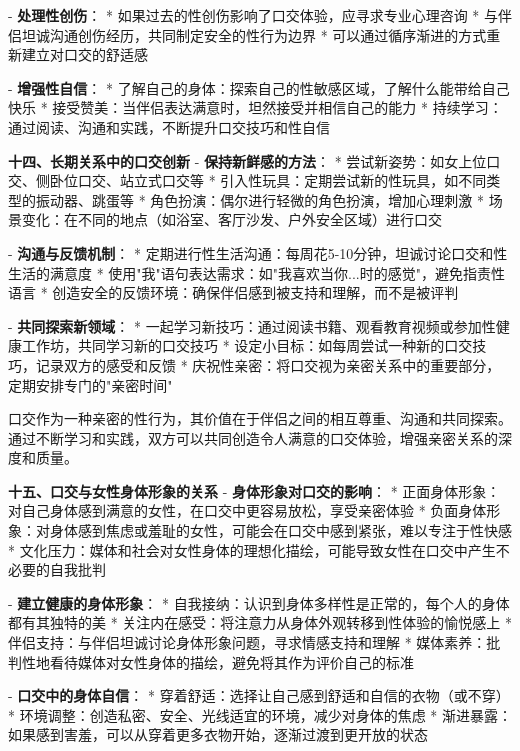 \begin{enumerate}
  - \textbf{处理性创伤}：
    * 如果过去的性创伤影响了口交体验，应寻求专业心理咨询
    * 与伴侣坦诚沟通创伤经历，共同制定安全的性行为边界
    * 可以通过循序渐进的方式重新建立对口交的舒适感

  - \textbf{增强性自信}：
    * 了解自己的身体：探索自己的性敏感区域，了解什么能带给自己快乐
    * 接受赞美：当伴侣表达满意时，坦然接受并相信自己的能力
    * 持续学习：通过阅读、沟通和实践，不断提升口交技巧和性自信

  \textbf{十四、长期关系中的口交创新}
  - \textbf{保持新鲜感的方法}：
    * 尝试新姿势：如女上位口交、侧卧位口交、站立式口交等
    * 引入性玩具：定期尝试新的性玩具，如不同类型的振动器、跳蛋等
    * 角色扮演：偶尔进行轻微的角色扮演，增加心理刺激
    * 场景变化：在不同的地点（如浴室、客厅沙发、户外安全区域）进行口交

  - \textbf{沟通与反馈机制}：
    * 定期进行性生活沟通：每周花5-10分钟，坦诚讨论口交和性生活的满意度
    * 使用"我"语句表达需求：如"我喜欢当你...时的感觉"，避免指责性语言
    * 创造安全的反馈环境：确保伴侣感到被支持和理解，而不是被评判

  - \textbf{共同探索新领域}：
    * 一起学习新技巧：通过阅读书籍、观看教育视频或参加性健康工作坊，共同学习新的口交技巧
    * 设定小目标：如每周尝试一种新的口交技巧，记录双方的感受和反馈
    * 庆祝性亲密：将口交视为亲密关系中的重要部分，定期安排专门的"亲密时间"

口交作为一种亲密的性行为，其价值在于伴侣之间的相互尊重、沟通和共同探索。通过不断学习和实践，双方可以共同创造令人满意的口交体验，增强亲密关系的深度和质量。

  \textbf{十五、口交与女性身体形象的关系}
  - \textbf{身体形象对口交的影响}：
    * 正面身体形象：对自己身体感到满意的女性，在口交中更容易放松，享受亲密体验
    * 负面身体形象：对身体感到焦虑或羞耻的女性，可能会在口交中感到紧张，难以专注于性快感
    * 文化压力：媒体和社会对女性身体的理想化描绘，可能导致女性在口交中产生不必要的自我批判

  - \textbf{建立健康的身体形象}：
    * 自我接纳：认识到身体多样性是正常的，每个人的身体都有其独特的美
    * 关注内在感受：将注意力从身体外观转移到性体验的愉悦感上
    * 伴侣支持：与伴侣坦诚讨论身体形象问题，寻求情感支持和理解
    * 媒体素养：批判性地看待媒体对女性身体的描绘，避免将其作为评价自己的标准

  - \textbf{口交中的身体自信}：
    * 穿着舒适：选择让自己感到舒适和自信的衣物（或不穿）
    * 环境调整：创造私密、安全、光线适宜的环境，减少对身体的焦虑
    * 渐进暴露：如果感到害羞，可以从穿着更多衣物开始，逐渐过渡到更开放的状态


\end{enumerate}
